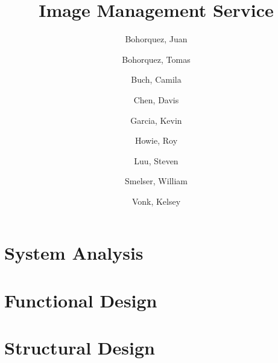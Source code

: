 \documentclass{article}
\begin{document}
\title{Image Management Service}
\author{
       Bohorquez, Juan
  \and Bohorquez, Tomas
  \and Buch, Camila
  \and Chen, Davis
  \and Garcia, Kevin
  \and Howie, Roy
  \and Luu, Steven
  \and Smelser, William
  \and Vonk, Kelsey
}
\date{}
\maketitle

\clearpage
  \tableofcontents

\clearpage
  \listoffigures
  \listoftables

\clearpage
\section{System Analysis}
  

\clearpage
\section{Functional Design}
  

\clearpage
\section{Structural Design}
  
\end{document}
